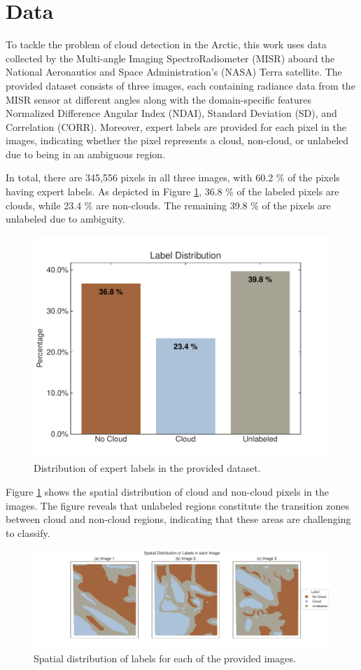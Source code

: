 \documentclass[11pt,letterpaper]{article}
\begin{document}
\section{Data}
\label{sec:Data}
To tackle the problem of cloud detection in the Arctic, this work uses data collected by the Multi-angle Imaging SpectroRadiometer (MISR) aboard the National Aeronautics and Space Administration's (NASA) Terra satellite. The provided dataset consists of three images, each containing radiance data from the MISR sensor at different angles along with the domain-specific features Normalized Difference Angular Index (NDAI), Standard Deviation (SD), and Correlation (CORR). Moreover, expert labels are provided for each pixel in the images, indicating whether the pixel represents a cloud, non-cloud, or unlabeled due to being in an ambiguous region.

In total, there are 345,556 pixels in all three images, with 60.2 \% of the pixels having expert labels. As depicted in Figure \ref{fig_eda_label_distrib}, 36.8 \% of the labeled pixels are clouds, while 23.4 \% are non-clouds. The remaining 39.8 \% of the pixels are unlabeled due to ambiguity.
\begin{figure}[H]
    \centering
    \includegraphics[width=0.7\linewidth]{figs/eda_label_distribution.pdf}
    \caption{Distribution of expert labels in the provided dataset.}
    \label{fig_eda_label_distrib}
\end{figure}

Figure \ref{fig_eda_label_distrib} shows the spatial distribution of cloud and non-cloud pixels in the images. The figure reveals that unlabeled regions constitute the transition zones between cloud and non-cloud regions, indicating that these areas are challenging to classify.
\begin{figure}[H]
    \centering
    \includegraphics[width=\linewidth]{figs/eda_label_distribution_map.pdf}
    \caption{Spatial distribution of labels for each of the provided images.}
    \label{fig_eda_spatial_distrib}
\end{figure}
\end{document}
